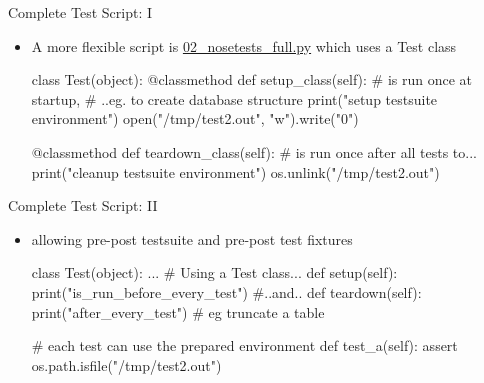 \begin{pyframe}{Complete Test Script: I}
\begin{itemize}
\item A more flexible script is \href{https://github.com/ioggstream/python-course/blob/master/python-for-sysadmin/02\_nosetests\_full.py}{02\_nosetests\_full.py}
which uses a Test class
\begin{pycode}
class Test(object):
  @classmethod
  def setup_class(self): # is run once at startup, 
    # ..eg. to create database structure
    print("setup testsuite environment")
    open("/tmp/test2.out", "w").write("0")

  @classmethod
  def teardown_class(self): # is run once after all tests to...
    print("cleanup testsuite environment")
    os.unlink("/tmp/test2.out")

 
\end{pycode} 
\end{itemize}
\end{pyframe}

\begin{pyframe}{Complete Test Script: II}
\begin{itemize}
\item allowing pre-post testsuite and pre-post test fixtures
\begin{pycode}
class Test(object):
  ...
  # Using a Test class...
  def setup(self): 
    print("is_run_before_every_test") #..and..
  def teardown(self): 
    print("after_every_test") # eg truncate a table

  # each test can use the prepared environment
  def test_a(self): 
    assert os.path.isfile("/tmp/test2.out")
 
\end{pycode}
\end{itemize}
\end{pyframe}
